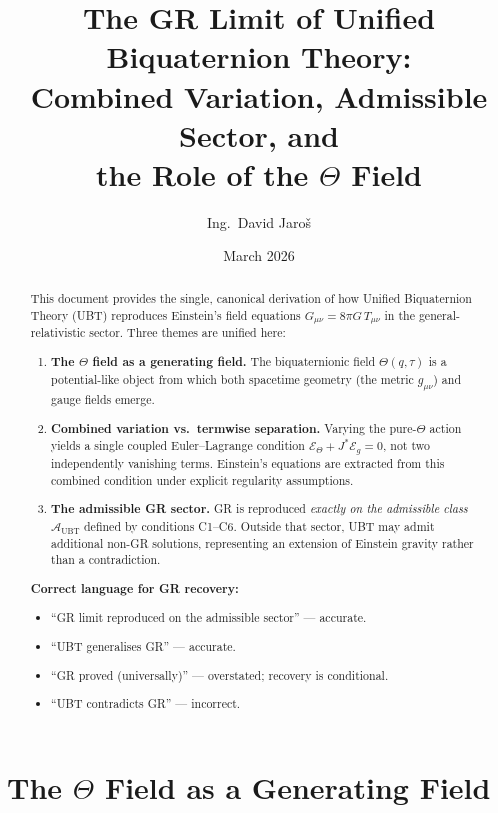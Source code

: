 \documentclass[12pt]{article}
\title{\textbf{The GR Limit of Unified Biquaternion Theory:\\
       Combined Variation, Admissible Sector, and\\
       the Role of the $\Theta$ Field}}
\author{Ing.\ David Jaroš}
\date{March 2026}
\theoremstyle{definition}
\theoremstyle{remark}
\begin{document}
\maketitle
\tableofcontents
\bigskip

\begin{abstract}
This document provides the single, canonical derivation of how Unified
Biquaternion Theory (UBT) reproduces Einstein's field equations
$G_{\mu\nu} = 8\pi G\,T_{\mu\nu}$ in the general-relativistic sector.
Three themes are unified here:

\begin{enumerate}
  \item \textbf{The $\Theta$ field as a generating field.}  The biquaternionic
    field $\Theta(q,\tau)$ is a potential-like object from which both spacetime
    geometry (the metric $g_{\mu\nu}$) and gauge fields emerge.

  \item \textbf{Combined variation vs.\ termwise separation.}  Varying the
    pure-$\Theta$ action yields a single coupled Euler--Lagrange condition
    $\mathcal{E}_\Theta + J^{*}\mathcal{E}_g = 0$, not two independently
    vanishing terms.  Einstein's equations are extracted from this combined
    condition under explicit regularity assumptions.

  \item \textbf{The admissible GR sector.}  GR is reproduced \emph{exactly on
    the admissible class} $\mathcal{A}_{\mathrm{UBT}}$ defined by conditions
    C1--C6.  Outside that sector, UBT may admit additional non-GR solutions,
    representing an extension of Einstein gravity rather than a contradiction.
\end{enumerate}

\medskip\noindent
\textbf{Correct language for GR recovery:}
\begin{itemize}
  \item[\checkmark] ``GR limit reproduced on the admissible sector'' — accurate.
  \item[\checkmark] ``UBT generalises GR'' — accurate.
  \item[$\times$] ``GR proved (universally)'' — overstated; recovery is conditional.
  \item[$\times$] ``UBT contradicts GR'' — incorrect.
\end{itemize}
\end{abstract}

\section{The $\Theta$ Field as a Generating Field}
\label{sec:theta_role}
\end{document}
